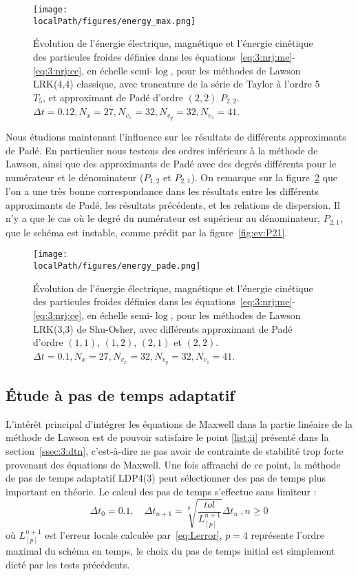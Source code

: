 \begin{figure}[h]
  \centering
  \texttt{[image: \\localPath/figures/energy\_max.png]}
  \caption{Évolution de l'énergie électrique, magnétique et l'énergie cinétique des particules froides définies dans les équations~\ref{eq:3:nrj:me}-\ref{eq:3:nrj:ce}, en échelle semi-$\log$, pour les méthodes de Lawson LRK(4,4) classique, avec troncature de la série de Taylor à l'ordre 5 $T_5$, et approximant de Padé d'ordre $(2,2)$ $P_{2,2}$. $\Delta t = 0.12, N_x=27, N_{v_x}=32, N_{v_y}=32, N_{v_z}=41$.}
  \label{fig:approx:energies:cfl}
\end{figure}

Nous étudions maintenant l'influence sur les résultats de différents approximants de Padé. En particulier nous testons des ordres inférieurs à la méthode de Lawson, ainsi que des approximants de Padé avec des degrés différents pour le numérateur et le dénominateur ($P_{1,2}$ et $P_{2,1}$). On remarque sur la figure~\ref{fig:approx:energies:pade} que l'on a une très bonne correspondance dans les résultats entre les différents approximants de Padé, les résultats précédents, et les relations de dispersion. Il n'y a que le cas où le degré du numérateur est supérieur au dénominateur, $P_{2,1}$, que le schéma est instable, comme prédit par la figure~\ref{fig:ev:P21}.

\begin{figure}[h]
  \centering
  \texttt{[image: \\localPath/figures/energy\_pade.png]}
  \caption{Évolution de l'énergie électrique, magnétique et l'énergie cinétique des particules froides définies dans les équations~\ref{eq:3:nrj:me}-\ref{eq:3:nrj:ce}, en échelle semi-$\log$, pour les méthodes de Lawson LRK(3,3) de Shu-Osher, avec différents approximant de Padé d'ordre $(1,1)$, $(1,2)$, $(2,1)$ et $(2,2)$. $\Delta t = 0.1, N_x=27, N_{v_x}=32, N_{v_y}=32, N_{v_z}=41$.}
  \label{fig:approx:energies:pade}
\end{figure}


\FloatBarrier
\subsection{Étude à pas de temps adaptatif}

L'intérêt principal d'intégrer les équations de Maxwell dans la partie linéaire de la méthode de Lawson est de pouvoir satisfaire le point \ref{list:ii} présenté dans la section~\ref{ssec:3:dtn}, c'est-à-dire ne pas avoir de contrainte de stabilité trop forte provenant des équations de Maxwell. Une fois affranchi de ce point, la méthode de pas de temps adaptatif LDP4(3) peut sélectionner des pas de temps plus important en théorie. Le calcul des pas de temps s'effectue sans limiteur :
$$
  \Delta t_0 = 0.1,\quad \Delta t_{n+1} = \sqrt[p]{\frac{tol}{L_{[p]}^{n+1}}}\Delta t_n\ ,n\geq 0
$$
où $L_{[p]}^{n+1}$ est l'erreur locale calculée par~\ref{eq:Lerror}, $p=4$ représente l'ordre maximal du schéma en temps, le choix du pas de temps initial est simplement dicté par les tests précédents.

